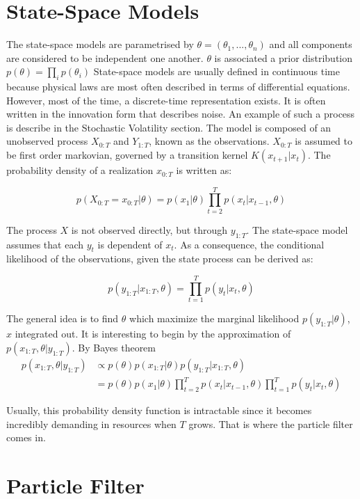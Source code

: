\documentclass[11pt,a4,twosided,singlespacing,titlepagenumber=on]{scrreprt}
\numberwithin{equation}{chapter} %
\theoremstyle{remark}
\begin{document}
\section{State-Space Models}
The state-space models are parametrised by $\theta = (\theta_1,...,\theta_n)$ and all components are considered to be independent one another. $\theta$ is associated a prior distribution $p(\theta) = \prod_i p(\theta_i)$ State-space models are usually defined in continuous time because physical laws are most often described in terms of differential equations. However, most of the time, a discrete-time representation exists. It is often written in the innovation form that describes noise. An example of such a process is describe in the Stochastic Volatility section. The model is composed of an unobserved process $X_{0:T}$ and $Y_{1:T}$, known as the observations. $X_{0:T}$ is assumed to be first order markovian, governed by a transition kernel $K(x_{t+1}|x_t)$. The probability density of a realization $x_{0:T}$ is written as:

$$p(X_{0:T} = x_{0:T} | \theta) = p(x_1|\theta) \prod_{t=2}^T p(x_t|x_{t-1}, \theta) $$

The process $X$ is not observed directly, but through $y_{1:T}$. The state-space model assumes that each $y_t$ is dependent of $x_t$. As a consequence, the conditional likelihood of the observations, given the state process can be derived as:

$$p(y_{1:T} | x_{1:T}, \theta) = \prod_{t=1}^T p(y_t | x_t, \theta) $$

The general idea is to find $\theta$ which maximize the marginal likelihood $p(y_{1:T}|\theta)$, $x$ integrated out. It is interesting to begin by the approximation of $p(x_{1:T}, \theta | y_{1:T})$. By Bayes theorem
\begin{align*}
p(x_{1:T}, \theta | y_{1:T}) &\propto p(\theta)p(x_{1:T}|\theta)p(y_{1:T}|x_{1:T}, \theta) \\
 &= p(\theta) p(x_1|\theta) \prod_{t=2}^T p(x_t|x_{t-1}, \theta) \prod_{t=1}^T p(y_t | x_t, \theta)
\end{align*}

\noindent
Usually, this probability density function is intractable since it becomes incredibly demanding in resources when $T$ grows. That is where the particle filter comes in.

\section{Particle Filter}
\end{document}
